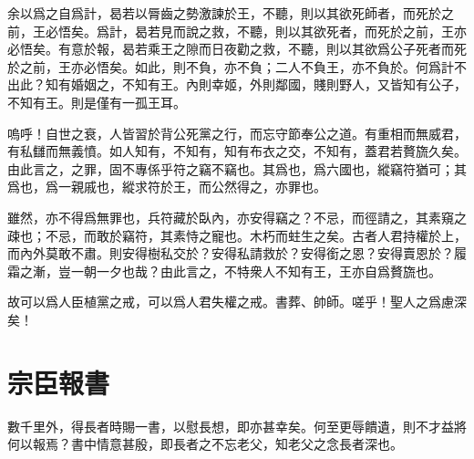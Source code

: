 余以爲之自爲計，曷若以脣齒之勢激諫於王，不聽，則以其欲死師者，而死於之前，王必悟矣。爲計，曷若見而說之救，不聽，則以其欲死者，而死於之前，王亦必悟矣。有意於報，曷若乘王之隙而日夜勸之救，不聽，則以其欲爲公子死者而死於之前，王亦必悟矣。如此，則不負，亦不負；二人不負王，亦不負於。何爲計不出此？知有婚姻之，不知有王。內則幸姬，外則鄰國，賤則野人，又皆知有公子，不知有王。則是僅有一孤王耳。

嗚呼！自世之衰，人皆習於背公死黨之行，而忘守節奉公之道。有重相而無威君，有私讎而無義憤。如人知有，不知有，知有布衣之交，不知有，蓋君若贅旒久矣。由此言之，之罪，固不專係乎符之竊不竊也。其爲也，爲六國也，縱竊符猶可；其爲也，爲一親戚也，縱求符於王，而公然得之，亦罪也。

雖然，亦不得爲無罪也，兵符藏於臥內，亦安得竊之？不忌，而徑請之，其素窺之疎也；不忌，而敢於竊符，其素恃之寵也。木朽而蛀生之矣。古者人君持權於上，而內外莫敢不肅。則安得樹私交於？安得私請救於？安得銜之恩？安得賣恩於？履霜之漸，豈一朝一夕也哉？由此言之，不特衆人不知有王，王亦自爲贅旒也。

故可以爲人臣植黨之戒，可以爲人君失權之戒。書葬、帥師。嗟乎！聖人之爲慮深矣！

\theendnotes

\section[報劉一丈書\quad{\small 宗臣}]{{\normalsize 宗臣}\quad 報書} 
數千里外，得長者時賜一書，以慰長想，即亦甚幸矣。何至更辱饋遺，則不才益將何以報焉？書中情意甚殷，即長者之不忘老父，知老父之念長者深也。

